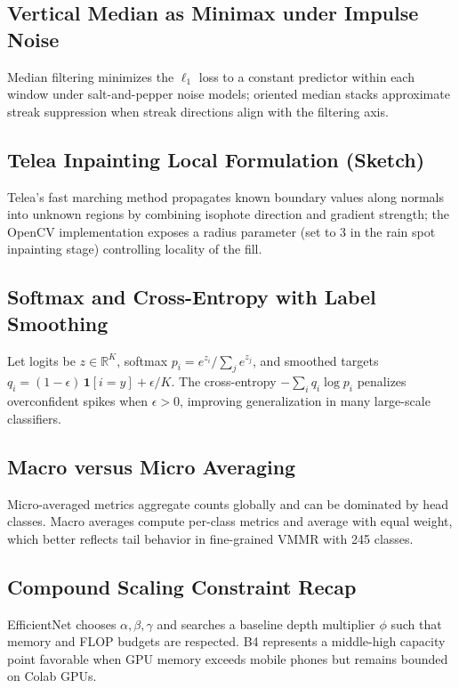 \documentclass[10pt, conference]{IEEEtran}
\begin{document}
\subsection{Vertical Median as Minimax under Impulse Noise}
Median filtering minimizes the $\ell_1$ loss to a constant predictor within each window under salt-and-pepper noise models; oriented median stacks approximate streak suppression when streak directions align with the filtering axis.

\subsection{Telea Inpainting Local Formulation (Sketch)}
Telea's fast marching method propagates known boundary values along normals into unknown regions by combining isophote direction and gradient strength; the OpenCV implementation exposes a radius parameter (set to 3 in the rain spot inpainting stage) controlling locality of the fill.

\subsection{Softmax and Cross-Entropy with Label Smoothing}
Let logits be $z\in\mathbb{R}^K$, softmax $p_i=e^{z_i}/\sum_j e^{z_j}$, and smoothed targets $q_i=(1-\epsilon)\,\mathbf{1}[i=y]+\epsilon/K$. The cross-entropy $-\sum_i q_i\log p_i$ penalizes overconfident spikes when $\epsilon>0$, improving generalization in many large-scale classifiers.

\subsection{Macro versus Micro Averaging}
Micro-averaged metrics aggregate counts globally and can be dominated by head classes. Macro averages compute per-class metrics and average with equal weight, which better reflects tail behavior in fine-grained VMMR with 245 classes.

\subsection{Compound Scaling Constraint Recap}
EfficientNet chooses $\alpha,\beta,\gamma$ and searches a baseline depth multiplier $\phi$ such that memory and FLOP budgets are respected. B4 represents a middle-high capacity point favorable when GPU memory exceeds mobile phones but remains bounded on Colab GPUs.
\end{document}
